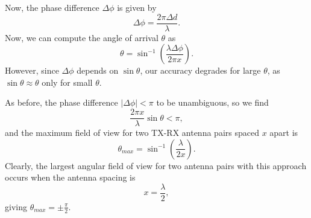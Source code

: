 Now, the phase difference $\Delta \phi$ is given by
\begin{equation}
	\Delta \phi = \frac{2\pi \Delta d}{\lambda}.
\end{equation}
Now, we can compute the angle of arrival $\theta$ as 
\begin{equation}
	\theta = \sin^{-1}(\frac{\lambda\Delta\phi}{2\pi x}).
\end{equation}
However, since $\Delta\phi$ depends on $\sin\theta$, our accuracy degrades for
large $\theta$, as $\sin\theta \approx \theta$ only for small $\theta$. 

As before, the phase difference $|\Delta\phi |<\pi$ to be unambiguous, so we
find
\begin{equation}
	\frac{2\pi x}{\lambda} \sin\theta < \pi,
\end{equation}
and the maximum field of view for two TX-RX antenna pairs spaced $x$ apart is 
\begin{equation}
	\theta_{max} = \sin^{-1}(\frac{\lambda}{2x}).
\end{equation}
Clearly, the largest angular field of view for two antenna pairs with this
approach occurs when the antenna spacing is
\begin{equation}
	x = \frac{\lambda}{2},
\end{equation}
giving $\theta_{max} = \pm\frac{\pi}{2}$.

